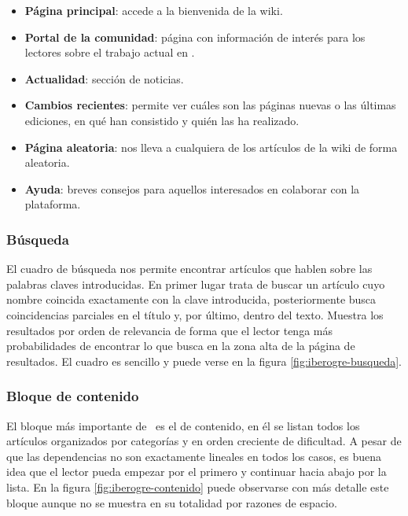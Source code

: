 \begin{itemize}
    \itemsep0em
    \item \textbf{Página principal}: accede a la bienvenida de la wiki.
    \item \textbf{Portal de la comunidad}: página con información de interés
    para los lectores sobre el trabajo actual en \wiki.
    \item \textbf{Actualidad}: sección de noticias.
    \item \textbf{Cambios recientes}: permite ver cuáles son las páginas nuevas
    o las últimas ediciones, en qué han consistido y quién las ha realizado.
    \item \textbf{Página aleatoria}: nos lleva a cualquiera de los artículos
    de la wiki de forma aleatoria.
    \item \textbf{Ayuda}: breves consejos para aquellos interesados en colaborar
    con la plataforma.
\end{itemize}


\subsubsection{Búsqueda}

El cuadro de búsqueda nos permite encontrar artículos que hablen sobre
las palabras claves introducidas. En primer lugar trata de buscar un artículo
cuyo nombre coincida exactamente con la clave introducida, posteriormente
busca coincidencias parciales en el título y, por último, dentro del texto.
Muestra los resultados por orden de relevancia de forma que el lector tenga
más probabilidades de encontrar lo que busca en la zona alta de la página
de resultados. El cuadro es sencillo y puede verse en la figura \ref{fig:iberogre-busqueda}.\\


\subsubsection{Bloque de contenido}

El bloque más importante de \wiki\ es el de contenido, en él se listan todos
los artículos organizados por categorías y en orden creciente de dificultad.
A pesar de que las dependencias no son exactamente lineales en todos los casos,
es buena idea que el lector pueda empezar por el primero y continuar hacia
abajo por la lista. En la figura \ref{fig:iberogre-contenido} puede observarse
con más detalle este bloque aunque no se muestra en su totalidad por razones
de espacio.\\

